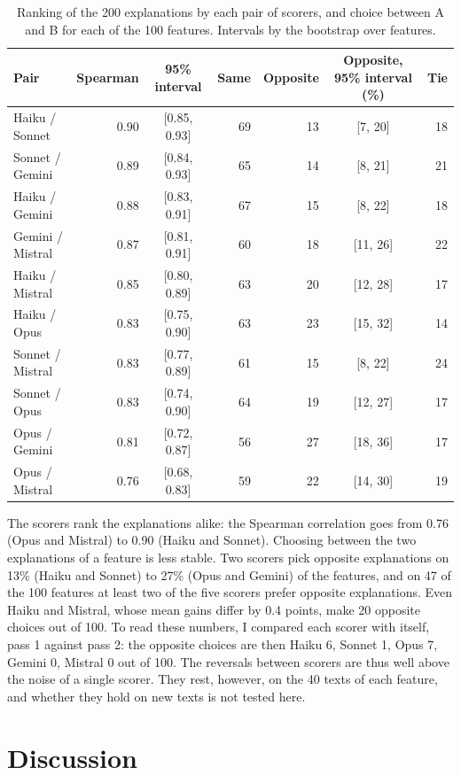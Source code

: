 \documentclass[11pt]{article}
\begin{document}
\begin{table}[h]
\centering
\small
\begin{tabular}{lrcrrcr}
\toprule
Pair & Spearman & 95\% interval & Same & Opposite & Opposite, 95\% interval (\%) & Tie \\
\midrule
Haiku / Sonnet & 0.90 & [0.85, 0.93] & 69 & 13 & [7, 20] & 18 \\
Sonnet / Gemini & 0.89 & [0.84, 0.93] & 65 & 14 & [8, 21] & 21 \\
Haiku / Gemini & 0.88 & [0.83, 0.91] & 67 & 15 & [8, 22] & 18 \\
Gemini / Mistral & 0.87 & [0.81, 0.91] & 60 & 18 & [11, 26] & 22 \\
Haiku / Mistral & 0.85 & [0.80, 0.89] & 63 & 20 & [12, 28] & 17 \\
Haiku / Opus & 0.83 & [0.75, 0.90] & 63 & 23 & [15, 32] & 14 \\
Sonnet / Mistral & 0.83 & [0.77, 0.89] & 61 & 15 & [8, 22] & 24 \\
Sonnet / Opus & 0.83 & [0.74, 0.90] & 64 & 19 & [12, 27] & 17 \\
Opus / Gemini & 0.81 & [0.72, 0.87] & 56 & 27 & [18, 36] & 17 \\
Opus / Mistral & 0.76 & [0.68, 0.83] & 59 & 22 & [14, 30] & 19 \\
\bottomrule
\end{tabular}
\caption{Ranking of the 200 explanations by each pair of scorers, and choice between A
and B for each of the 100 features. Intervals by the bootstrap over features.}
\label{tab:ranking}
\end{table}

The scorers rank the explanations alike: the Spearman correlation goes from 0.76 (Opus
and Mistral) to 0.90 (Haiku and Sonnet). Choosing between the two explanations of a
feature is less stable. Two scorers pick opposite explanations on 13\% (Haiku and
Sonnet) to 27\% (Opus and Gemini) of the features, and on 47 of the 100 features at
least two of the five scorers prefer opposite explanations. Even Haiku and Mistral,
whose mean gains differ by 0.4 points, make 20 opposite choices out of 100. To read
these numbers, I compared each scorer with itself, pass 1 against pass 2: the opposite
choices are then Haiku 6, Sonnet 1, Opus 7, Gemini 0, Mistral 0 out of 100. The reversals between scorers are thus
well above the noise of a single scorer. They rest, however, on the 40 texts of each
feature, and whether they hold on new texts is not tested here.

\section{Discussion}
\end{document}
